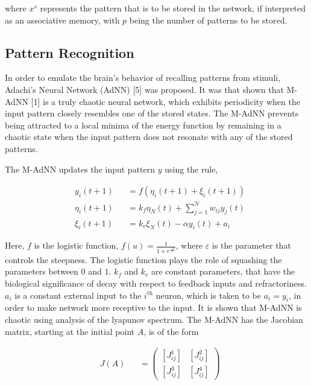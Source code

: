 \documentclass[12pt, letterpaper]{article}
\begin{document}
where $x^s$ represents the pattern that is to be stored in the network, if interpreted as an associative memory, with $p$ being the number of patterns to be stored.

\subsection*{Pattern Recognition}

In order to emulate the brain's behavior of recalling patterns from stimuli, Adachi’s Neural Network (AdNN) [5] was proposed. It was that shown that M-AdNN [1] is a truly chaotic neural network, which exhibits periodicity when the input pattern closely resembles one of the stored states. The M-AdNN prevents being attracted to a local minima of the energy function by remaining in a chaotic state when the input pattern does not resonate with any of the stored patterns.

The M-AdNN updates the input pattern $y$ using the rule,

$$
\begin{aligned}
& y_i(t+1) &&= f(\eta_i(t+1) + \xi_i(t+1))\\
& \eta_i(t+1) &&= k_f \eta_N(t) + \sum_{j = 1}^N w_{ij} y_j(t)\\
& \xi_i(t+1) &&= k_r \xi_N(t) - \alpha y_i(t) + a_i
\end{aligned}
$$

Here, $f$ is the logistic function, $f(u) = \frac{1}{1 + e^\frac{-u}{\varepsilon}}$, where $\varepsilon$ is the parameter that controls the steepness. The logistic function plays the role of squashing the parameters between $0$ and $1$. $k_f$ and $k_r$ are constant parameters, that have the biological significance of decay with respect to feedback inputs and refractoriness. $a_i$ is a constant external input to the $i^{\text{th}}$ neuron, which is taken to be $a_i = y_i$, in order to make network more receptive to the input. It is shown that M-AdNN is chaotic using analysis of the lyapunov spectrum. The M-AdNN has the Jacobian matrix, starting at the initial point $A$, is of the form

$$
\begin{aligned}
& J(A) &&= \begin{pmatrix}
  [J_{ij}^1] & [J_{ij}^2]\\
  [J_{ij}^3] & [J_{ij}^4]
  \end{pmatrix}\\
\end{aligned}
$$
\end{document}

